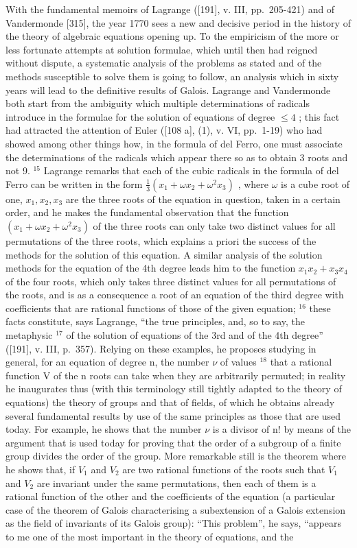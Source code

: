With the fundamental memoirs of Lagrange ({[}191{]}, v. III, pp.~205-421) and of Vandermonde {[}315{]}, the year 1770 sees a new and decisive period in the history of the theory of algebraic equations opening up. To the empiricism of the more or less fortunate attempts at solution formulae, which until then had reigned without dispute, a systematic analysis of the problems as stated and of the methods susceptible to solve them is going to follow, an analysis which in sixty years will lead to the definitive results of Galois. Lagrange and Vandermonde both start from the ambiguity which multiple determinations of radicals introduce in the formulae for the solution of equations of degree \(\leq 4\) ; this fact had attracted the attention of Euler ({[}108 a{]}, (1), v. VI, pp.~1-19) who had showed among other things how, in the formula of del Ferro, one must associate the determinations of the radicals which appear there so as to obtain 3 roots and not 9. \(^{15}\) Lagrange remarks that each of the cubic radicals in the formula of del Ferro can be written in the form \(\frac{1}{3}(x_1 + \omega x_2 + \omega^2 x_3)\) , where \(\omega\) is a cube root of one, \(x_1, x_2, x_3\) are the three roots of the equation in question, taken in a certain order, and he makes the fundamental observation that the function \((x_1 + \omega x_2 + \omega^2 x_3)\) of the three roots can only take two distinct values for all permutations of the three roots, which explains a priori the success of the methods for the solution of this equation. A similar analysis of the solution methods for the equation of the 4th degree leads him to the function \(x_{1}x_{2} + x_{3}x_{4}\) of the four roots, which only takes three distinct values for all permutations of the roots, and is as a consequence a root of an equation of the third degree with coefficients that are rational functions of those of the given equation; \(^{16}\) these facts constitute, says Lagrange, ``the true principles, and, so to say, the metaphysic \(^{17}\) of the solution of equations of the 3rd and of the 4th degree'' ({[}191{]}, v. III, p.~357). Relying on these examples, he proposes studying in general, for an equation of degree n, the number \(\nu\) of values \(^{18}\) that a rational function V of the n roots can take when they are arbitrarily permuted; in reality he inaugurates thus (with this terminology still tightly adapted to the theory of equations) the theory of groups and that of fields, of which he obtains already several fundamental results by use of the same principles as those that are used today. For example, he shows that the number \(\nu\) is a divisor of n! by means of the argument that is used today for proving that the order of a subgroup of a finite group divides the order of the group. More remarkable still is the theorem where he shows that, if \(V_{1}\) and \(V_{2}\) are two rational functions of the roots such that \(V_{1}\) and \(V_{2}\) are invariant under the same permutations, then each of them is a rational function of the other and the coefficients of the equation (a particular case of the theorem of Galois characterising a subextension of a Galois extension as the field of invariants of its Galois group): ``This problem'', he says, ``appears to me one of the most important in the theory of equations, and the 